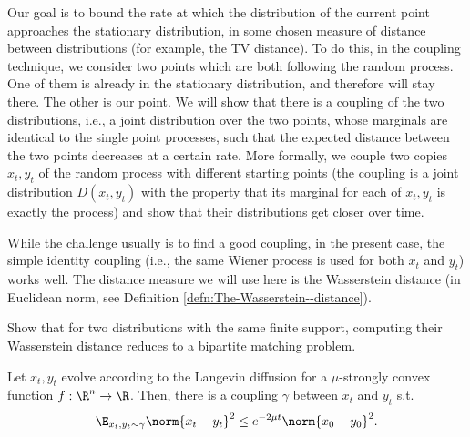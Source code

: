 Our goal is to bound the rate at which the distribution of the current
point approaches the stationary distribution, in some chosen measure
of distance between distributions (for example, the TV distance).
To do this, in the coupling technique, we consider two points which
are both following the random process. One of them is already in the
stationary distribution, and therefore will stay there. The other
is our point. We will show that there is a coupling of the two distributions,
i.e., a joint distribution over the two points, whose marginals are
identical to the single point processes, such that the expected distance
between the two points decreases at a certain rate. More formally,
we couple two copies $x_{t},y_{t}$ of the random process with different
starting points (the coupling is a joint distribution $D(x_{t},y_{t})$
with the property that its marginal for each of $x_{t},y_{t}$ is
exactly the process) and show that their distributions get closer
over time. 

While the challenge usually is to find a good coupling, in the present
case, the simple identity coupling (i.e., the same Wiener process
is used for both $x_{t}$ and $y_{t}$) works well. The distance measure
we will use here is the Wasserstein distance (in Euclidean norm, see
Definition \ref{defn:The-Wasserstein--distance}). 
\begin{xca}
Show that for two distributions with the same finite support, computing
their Wasserstein distance reduces to a bipartite matching problem. 
\end{xca}

\begin{lem}
Let $x_{t},y_{t}$ evolve according to the Langevin diffusion for
a $\mu$-strongly convex function $f:\R^{n}\rightarrow\R$. Then,
there is a coupling $\gamma$ between $x_{t}$ and $y_{t}$ s.t.
\[
\E_{x_{t},y_{t}\sim\gamma}\norm{x_{t}-y_{t}}^{2}\le e^{-2\mu t}\norm{x_{0}-y_{0}}^{2}.
\]
\end{lem}

